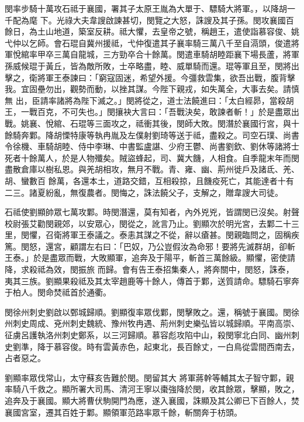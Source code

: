 \begin{pinyinscope}
 閔率步騎十萬攻石祗于襄國，署其子太原王胤為大單于、驃騎大將軍。，以降胡一千配為麾
 下。光祿大夫韋謏啟諫甚切，閔覽之大怒，誅謏及其子孫。閔攻襄國百餘日，為土山地道，築室反耕。祗大懼，去皇帝之號，稱趙王，遣使詣慕容俊、姚弋仲以乞師。會石琨自冀州援祗，弋仲復遣其子襄率騎三萬八千至自滆頭，俊遣將軍悅綰率甲卒三萬自龍城，三方勁卒合十餘萬。閔遣車騎胡睦距襄下場長蘆，將軍孫威候琨于黃丘，皆為敵所敗，士卒略盡，睦、威單騎而還。琨等軍且至，閔將出擊之，衛將軍王泰諫曰：「窮寇固迷，希望外援。今彊救雲集，欲吾出戰，腹背擊我。宜固壘勿出，觀勢而動，以挫其謀。今陛下親戎，如失萬全，大事去矣。請慎無
 出，臣請率諸將為陛下滅之。」閔將從之，道士法饒進曰：「太白經昴，當殺胡王，一戰百克，不可失也。」閔攘袂大言曰：「吾戰決矣，敢諫者斬！」於是盡眾出戰。姚襄、悅綰、石琨等三面攻之，祗衝其後，閔師大敗。閔潛於襄國行宮，與十餘騎奔鄴。降胡慄特康等執冉胤及左僕射劉琦等送于祗，盡殺之。司空石璞、尚書令徐機、車騎胡睦、侍中李琳、中書監盧諶、少府王鬱、尚書劉欽、劉休等諸將士死者十餘萬人，於是人物殲矣。賊盜蜂起，司、冀大饑，人相食。自季龍末年而閔盡散倉庫以樹私恩。與羌胡相攻，無月不戰。青、雍、幽、荊州徙戶及諸氐、羌、胡、蠻數百
 餘萬，各還本土，道路交錯，互相殺掠，且饑疫死亡，其能達者十有二三。諸夏紛亂，無復農者。閔悔之，誅法饒父子，支解之，贈韋謏大司徒。



 石祗使劉顯帥眾七萬攻鄴。時閔潛還，莫有知者，內外兇兇，皆謂閔已沒矣。射聲校尉張艾勸閔親郊，以安眾心，閔從之，訛言乃止。劉顯次於明光宮，去鄴二十三里，閔懼，召衛將軍王泰議之。泰恚其謀之不從，辭以瘡甚。閔親臨問之，固稱疾篤。閔怒，還宮，顧謂左右曰：「巴奴，乃公豈假汝為命邪！要將先滅群胡，卻斬王泰。」於是盡眾而戰，大敗顯軍，追奔及于陽平，斬首三萬餘級。顯懼，密使請降，求殺祗為效，閔振旅
 而歸。會有告王泰招集秦人，將奔關中，閔怒，誅泰，夷其三族。劉顯果殺祗及其太宰趙鹿等十餘人，傳首于鄴，送質請命。驃騎石寧奔于柏人。閔命焚祗首於通衢。



 閔徐州刺史劉啟以鄄城歸順。劉顯復率眾伐鄴，閔擊敗之。還，稱號于襄國。閔徐州刺史周成、兗州刺史魏統、豫州牧冉遇、荊州刺史樂弘皆以城歸順。平南高崇、征虜呂護執洛州刺史鄭系，以三河歸順。慕容彪攻陷中山，殺閔寧北白同、幽州刺史劉準，降于慕容俊。時有雲黃赤色，起東北，長百餘丈，一白鳥從雲間西南去，占者惡之。



 劉顯率眾伐常山，太守蘇亥告難於閔。閔留其大
 將軍蔣幹等輔其太子智守鄴，親率騎八千救之。顯所署大司馬、清河王寧以棗強降於閔，收其餘眾，擊顯，敗之，追奔及于襄國。顯大將曹伏駒開門為應，遂入襄國，誅顯及其公卿已下百餘人，焚襄國宮室，遷其百姓于鄴。顯領軍范路率眾千餘，斬關奔于枋頭。




\end{pinyinscope}
